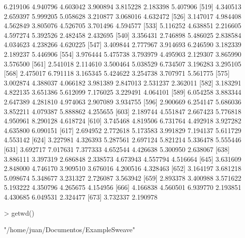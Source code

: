 \documentclass[12pt]{article}
\begin{document}
\begin{Schunk}
\begin{Soutput}
[512]  6.219106  4.940796  4.603042  3.900894  3.815228  2.183398  5.407906
[519]  4.340513  2.659397  5.999205  5.058628  3.210877  3.068016  4.632472
[526]  3.147017  4.984408  4.562849  3.805076  4.526705  3.701496  4.594577
[533]  5.116252  4.638851  2.216605  4.597274  5.392526  2.482458  2.432695
[540]  3.356431  2.746898  5.486025  2.838584  4.034623  4.238266  4.620225
[547]  3.409844  2.777967  3.914693  6.246590  3.182339  2.189237  5.446906
[554]  3.976444  5.475738  3.793979  4.495903  2.129307  3.865990  3.576500
[561]  2.541018  2.114610  3.500464  5.038529  6.734507  3.196283  3.295105
[568]  2.475017  6.791118  3.165345  5.424622  3.254738  3.707971  5.561775
[575]  3.002874  4.388037  4.066182  3.981389  2.847013  2.531237  2.362011
[582]  3.183291  4.822135  3.651386  5.612099  7.176025  3.229491  4.064101
[589]  6.054258  3.883344  2.647389  4.281810  4.974063  2.907089  3.934755
[596]  2.900669  6.254147  5.686036  3.852211  4.079387  5.888862  4.255655
[603]  2.189744  4.551847  2.667423  5.776818  4.950961  8.290128  4.618724
[610]  3.745468  4.819506  6.731764  4.492918  3.927282  4.635800  6.090151
[617]  2.694952  2.772618  5.173583  3.991829  7.194137  5.611729  4.553142
[624]  3.227981  4.326393  5.287561  2.697124  5.821214  5.336478  5.555446
[631]  3.692717  7.017631  7.377333  4.652544  4.426638  5.300950  2.638067
[638]  3.886111  3.397319  2.686848  2.338573  4.673943  4.557794  4.516664
[645]  3.631609  2.848000  4.746170  3.909510  3.676016  4.200516  4.328463
[652]  3.164197  3.681218  5.098674  5.348677  3.231327  2.726087  3.563942
[659]  2.893378  3.400988  3.571622  5.193222  4.350796  4.265675  4.154956
[666]  4.166838  4.560501  6.939770  2.193851  4.430685  6.049531  2.324477
[673]  3.732337  2.190978
\end{Soutput}
\begin{Sinput}
> getwd()
\end{Sinput}
\begin{Soutput}
[1] "/home/juan/Documentos/ExampleSweave"
\end{Soutput}
\end{Schunk}
\end{document}
